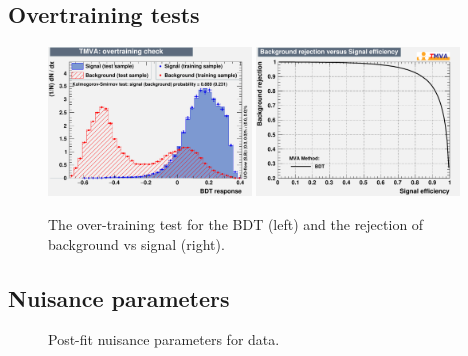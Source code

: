 \subsection{Overtraining tests}


\begin{figure}
    \includegraphics[width=0.48\textwidth]{images/Run2/overtrain_BDT.pdf}
    \includegraphics[width=0.48\textwidth]{images/Run2/rejBvsS.pdf}
    \caption{The over-training test for the BDT (left) and the rejection of background vs signal (right).}
    \label{fig:ROC}
\end{figure}

\subsection{Nuisance parameters}

\begin{figure}[h!]
\begin{center}
\hspace{0.2cm}
\end{center}
\caption{Post-fit nuisance parameters for data.}
\label{fig:data}
\end{figure} 

